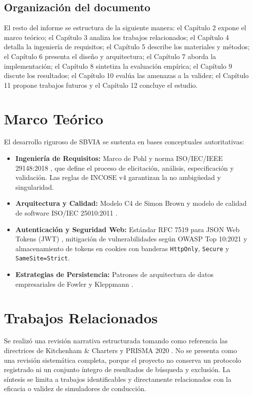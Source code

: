 \documentclass[11pt,a4paper]{report}
\begin{document}
\section{Organización del documento}
El resto del informe se estructura de la siguiente manera: el Capítulo 2 expone el marco teórico; el Capítulo 3 analiza los trabajos relacionados; el Capítulo 4 detalla la ingeniería de requisitos; el Capítulo 5 describe los materiales y métodos; el Capítulo 6 presenta el diseño y arquitectura; el Capítulo 7 aborda la implementación; el Capítulo 8 sintetiza la evaluación empírica; el Capítulo 9 discute los resultados; el Capítulo 10 evalúa las amenazas a la validez; el Capítulo 11 propone trabajos futuros y el Capítulo 12 concluye el estudio.

\chapter{Marco Teórico}
El desarrollo riguroso de SBVIA se sustenta en bases conceptuales autoritativas:
\begin{itemize}
    \item \textbf{Ingeniería de Requisitos:} Marco de Pohl \cite{pohl2010requirements} y norma ISO/IEC/IEEE 29148:2018 \cite{iso29148}, que define el proceso de elicitación, análisis, especificación y validación. Las reglas de INCOSE v4 \cite{incose2023} garantizan la no ambigüedad y singularidad.
    \item \textbf{Arquitectura y Calidad:} Modelo C4 de Simon Brown \cite{brown2023c4} y modelo de calidad de software ISO/IEC 25010:2011 \cite{iso25010}.
    \item \textbf{Autenticación y Seguridad Web:} Estándar RFC 7519 para JSON Web Tokens (JWT) \cite{rfc7519}, mitigación de vulnerabilidades según OWASP Top 10:2021 \cite{owasp2021} y almacenamiento de tokens en cookies con banderas \texttt{HttpOnly}, \texttt{Secure} y \texttt{SameSite=Strict}.
    \item \textbf{Estrategias de Persistencia:} Patrones de arquitectura de datos empresariales de Fowler \cite{fowler2002patterns} y Kleppmann \cite{kleppmann2017designing}.
\end{itemize}

\chapter{Trabajos Relacionados}
Se realizó una revisión narrativa estructurada tomando como referencia las directrices de Kitchenham \& Charters \cite{kitchenham2007guidelines} y PRISMA 2020 \cite{page2021prisma}. No se presenta como una revisión sistemática completa, porque el proyecto no conserva un protocolo registrado ni un conjunto íntegro de resultados de búsqueda y exclusión. La síntesis se limita a trabajos identificables y directamente relacionados con la eficacia o validez de simuladores de conducción.
\end{document}
